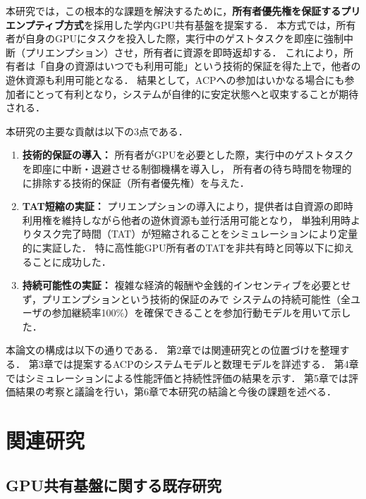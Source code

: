 \documentclass[12pt,a4paper]{jsarticle}
\begin{document}
本研究では，この根本的な課題を解決するために，\textbf{所有者優先権を保証するプリエンプティブ方式}を採用した学内GPU共有基盤を提案する．
本方式では，所有者が自身のGPUにタスクを投入した際，実行中のゲストタスクを即座に強制中断（プリエンプション）させ，所有者に資源を即時返却する．
これにより，所有者は「自身の資源はいつでも利用可能」という技術的保証を得た上で，他者の遊休資源も利用可能となる．
結果として，ACPへの参加はいかなる場合にも参加者にとって有利となり，システムが自律的に安定状態へと収束することが期待される．

本研究の主要な貢献は以下の3点である．

\begin{enumerate}
  \item \textbf{技術的保証の導入：}
    所有者がGPUを必要とした際，実行中のゲストタスクを即座に中断・退避させる制御機構を導入し，
    所有者の待ち時間を物理的に排除する技術的保証（所有者優先権）を与えた．

  \item \textbf{TAT短縮の実証：}
    プリエンプションの導入により，提供者は自資源の即時利用権を維持しながら他者の遊休資源も並行活用可能となり，
    単独利用時よりタスク完了時間（TAT）が短縮されることをシミュレーションにより定量的に実証した．
    特に高性能GPU所有者のTATを非共有時と同等以下に抑えることに成功した．

  \item \textbf{持続可能性の実証：}
    複雑な経済的報酬や金銭的インセンティブを必要とせず，プリエンプションという技術的保証のみで
    システムの持続可能性（全ユーザの参加継続率100\%）を確保できることを参加行動モデルを用いて示した．
\end{enumerate}

本論文の構成は以下の通りである．
第2章では関連研究との位置づけを整理する．
第3章では提案するACPのシステムモデルと数理モデルを詳述する．
第4章ではシミュレーションによる性能評価と持続性評価の結果を示す．
第5章では評価結果の考察と議論を行い，第6章で本研究の結論と今後の課題を述べる．

\section{関連研究}

\subsection{GPU共有基盤に関する既存研究}
\end{document}
